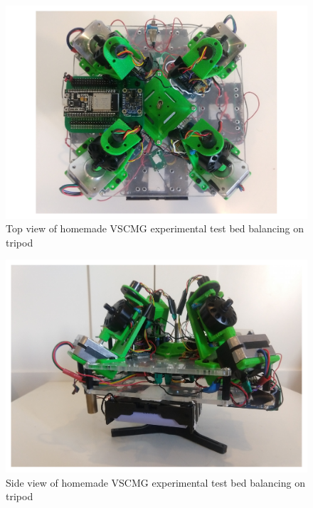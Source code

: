 \begin{figure}
    \centering
    \includegraphics[width=\textwidth]{figures/photos/tv-tb.pdf}
    \caption{Top view of homemade VSCMG experimental test bed balancing on tripod}
    \label{fig:tv-tb}
\end{figure}

\begin{figure}
    \centering
    \includegraphics[width=\textwidth]{figures/photos/sv-tb.pdf}
    \caption{Side view of homemade VSCMG experimental test bed balancing on tripod}
    \label{fig:sv-tb}
\end{figure}
